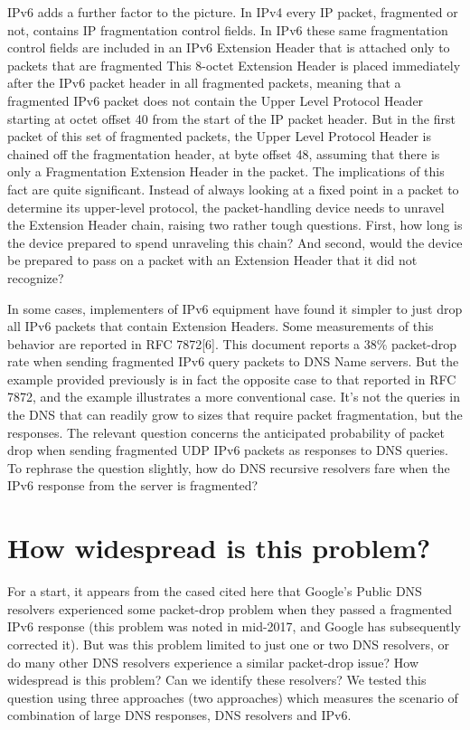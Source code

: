 IPv6 adds a further factor to the picture. In IPv4 every IP packet, fragmented
or not, contains IP fragmentation control fields. In IPv6 these
same fragmentation control fields are included in an IPv6 Extension
Header that is attached only to packets that are fragmented This 8-octet
Extension Header is placed immediately after the IPv6
packet header in all fragmented packets, meaning that a fragmented
IPv6 packet does not contain the Upper Level Protocol Header starting
at octet offset 40 from the start of the IP packet header. But in
the first packet of this set of fragmented packets, the Upper Level
Protocol Header is chained off the fragmentation header, at byte offset
48, assuming that there is only a Fragmentation Extension Header
in the packet. The implications of this fact are quite significant.
Instead of always looking at a fixed point in a packet to determine its
upper-level protocol, the packet-handling device needs to unravel the
Extension Header chain, raising two rather tough questions. First,
how long is the device prepared to spend unraveling this chain? And
second, would the device be prepared to pass on a packet with an
Extension Header that it did not recognize?

In some cases, implementers of IPv6 equipment have found it simpler
to just drop all IPv6 packets that contain Extension Headers. Some
measurements of this behavior are reported in RFC 7872[6]. This
document reports a 38\% packet-drop rate when sending fragmented
IPv6 query packets to DNS Name servers. But the example provided
previously is in fact the opposite case to that reported in RFC 7872,
and the example illustrates a more conventional case. It’s not the
queries in the DNS that can readily grow to sizes that require packet
fragmentation, but the responses. The relevant question concerns
the anticipated probability of packet drop when sending fragmented
UDP IPv6 packets as responses to DNS queries. To rephrase the question
slightly, how do DNS recursive resolvers fare when the IPv6
response from the server is fragmented?


\section{How widespread is this problem?}


For a start, it appears from the cased cited here that Google’s
Public DNS resolvers experienced some packet-drop problem when
they passed a fragmented IPv6 response (this problem was noted in
mid-2017, and Google has subsequently corrected it). But was this
problem limited to just one or two DNS resolvers, or do many other
DNS resolvers experience a similar packet-drop issue? How widespread
is this problem? Can we identify these resolvers? We tested this
question using three approaches (two approaches) which measures the
scenario of combination of large DNS responses, DNS resolvers and IPv6.

